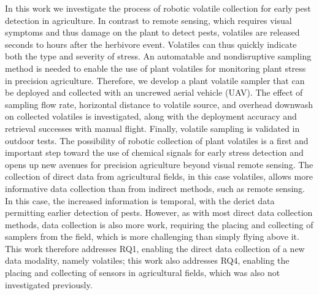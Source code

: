 In this work we investigate the process of robotic volatile collection for early pest detection in agriculture. In contrast to remote sensing, which requires visual symptoms and thus damage on the plant to detect pests, volatiles are released seconds to hours after the herbivore event. Volatiles can thus quickly indicate both the type and severity of stress. An automatable and nondisruptive sampling method is needed to enable the use of plant volatiles for monitoring plant stress in precision agriculture. Therefore, we develop a plant volatile sampler that can be deployed and collected with an uncrewed aerial vehicle (UAV). The effect of sampling flow rate, horizontal distance to volatile source, and overhead downwash on collected volatiles is investigated, along with the deployment accuracy and retrieval successes with manual flight. Finally, volatile sampling is validated in outdoor tests. The possibility of robotic collection of plant volatiles is a first and important step toward the use of chemical signals for early stress detection and opens up new avenues for precision agriculture beyond visual remote sensing.
The collection of direct data from agricultural fields, in this case volatiles, allows more informative data collection than from indirect methods, such as remote sensing. In this case, the increased information is temporal, with the derict data permitting earlier detection of pests. However, as with most direct data collection methods, data collection is also more work, requiring the placing and collecting of samplers from the field, which is more challenging than simply flying above it. This work therefore addresses RQ1, enabling the direct data collection of a new data modality, namely volatiles; this work also addresses RQ4, enabling the placing and collecting of sensors in agricultural fields, which was also not investigated previously. 


